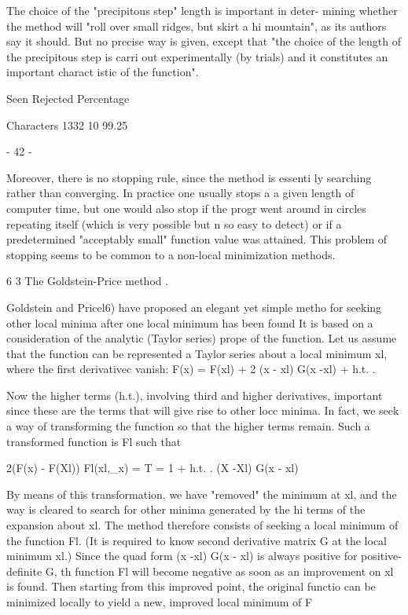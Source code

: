       The choice of the "precipitous step" length is important in deter-
mining whether the method will "roll over small ridges, but skirt a hi
mountain", as its authors say it should. But no precise way is given,
except that "the choice of the length of the precipitous step is carri
out experimentally (by trials) and it constitutes an important charact
istic of the function".
 
                 Seen Rejected  Percentage
 
Characters       1332       10   99.25
 
                                - 42 -
 
 
     Moreover, there is no stopping rule, since the method is essenti
ly searching rather than converging.  In practice one usually stops a
a given length of computer time, but one would also stop if the progr
went around in circles repeating itself (which is very possible but n
so easy to detect) or if a predetermined "acceptably small" function
value was attained.  This problem of stopping seems to be common to a
non-local minimization methods.
 
 
6 3  The Goldstein-Price method
 .
 
     Goldstein and Pricel6) have proposed an elegant yet simple metho
for seeking other local minima after one local minimum has been found
It is based on a consideration of the analytic (Taylor series) prope
of the function.  Let us assume that the function can be represented
a Taylor series about a local minimum xl, where the first derivativec
vanish:
                F(x) = F(xl) + 2 (x - xl) G(x -xl) + h.t. .
 
 
Now the higher terms (h.t.), involving third and higher derivatives,
important since these are the terms that will give rise to other locc
minima.  In fact, we seek a way of transforming the function so that
the higher terms remain.  Such a transformed function is Fl such that
 
 
                           2(F(x) - F(Xl))
            Fl(xl,_x) =        T         = 1 + h.t. .
                          (X -Xl) G(x - xl)
 
 
By means of this transformation, we have "removed" the minimum at xl,
and the way is cleared to search for other minima generated by the hi
terms of the expansion about xl.  The method therefore consists of
seeking a local minimum of the function Fl.  (It is required to know
second derivative matrix G at the local minimum xl.)  Since the quad
form (x -xl) G(x - xl) is always positive for positive-definite G, th
function Fl will become negative as soon as an improvement on xl is
found.  Then starting from this improved point, the original functio
can be minimized locally to yield a new, improved local minimum of F
 
